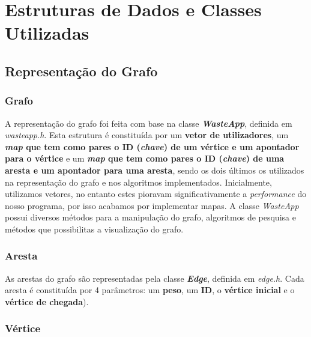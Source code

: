 \documentclass[article, a4paper, 12pt, oneside]{memoir}
\begin{document}
\newpage
\chapter[Estruturas de Dados  e Classes Utilizadas][Estruturas de Dados e Classes Utilizadas]{Estruturas de Dados e Classes Utilizadas} \label{\thechapter}

\section{Representação do Grafo}

\subsection{Grafo}

A representação do grafo foi feita com base na classe \textbf{\textit{WasteApp}}, definida em \textit{wasteapp.h}.  Esta estrutura é constituída por um \textbf{vetor de utilizadores}, um \textbf{\textit{map} que tem como pares o ID (\textit{chave}) de um vértice e um apontador para o vértice} e um \textbf{\textit{map} que tem como pares o ID (\textit{chave}) de uma aresta e um apontador para uma aresta}, sendo os dois últimos os utilizados na representação do grafo e nos algoritmos implementados. Inicialmente, utilizamos vetores, no entanto estes pioravam significativamente a \textit{performance} do nosso programa, por isso acabamos por implementar mapas. A classe \textit{WasteApp} possui diversos métodos para a manipulação do grafo, algoritmos de pesquisa e métodos que possibilitas a visualização do grafo.

\subsection{Aresta}

As arestas do grafo são representadas pela classe \textbf{\textit{Edge}}, definida em \textit{edge.h}. Cada aresta é constituída por 4 parâmetros: um \textbf{peso}, um \textbf{ID}, o \textbf{vértice inicial} e o \textbf{vértice de chegada}).

\subsection{Vértice}
\end{document}

